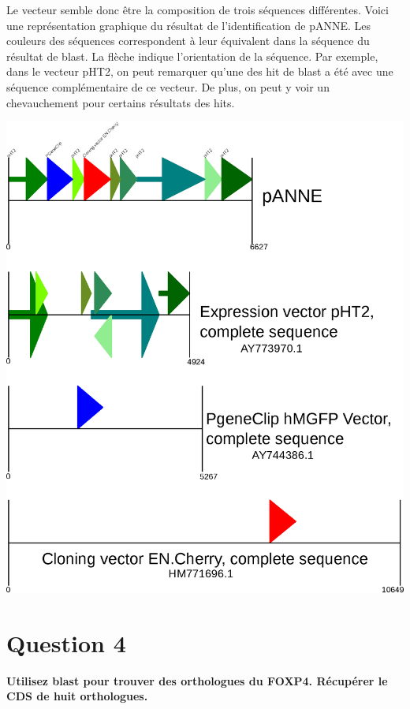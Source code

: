 \documentclass[10.8pt]{article} %
\begin{document}
Le vecteur semble donc être la composition de trois séquences différentes. Voici une représentation graphique du
résultat de l'identification de pANNE. Les couleurs des séquences correspondent à leur équivalent dans la séquence
du résultat de blast. La flèche indique l'orientation de la séquence. Par exemple, dans le vecteur pHT2, on peut
remarquer qu'une des hit de blast a été avec une séquence complémentaire de ce vecteur. De plus, on peut y 
voir un chevauchement pour certains résultats des hits.

\includegraphics[width=\linewidth]{pANNE.eps}


 
\section{Question 4} %

{\bf Utilisez blast pour trouver des orthologues du FOXP4. Récupérer le CDS de huit orthologues.}
\end{document}
